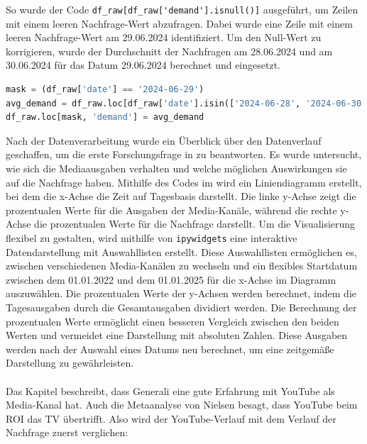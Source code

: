 So wurde der Code \verb|df_raw[df_raw['demand'].isnull()]| ausgeführt, um Zeilen mit einem leeren Nachfrage-Wert abzufragen. Dabei wurde eine Zeile mit einem leeren Nachfrage-Wert am 29.06.2024 identifiziert. Um den Null-Wert zu korrigieren, wurde der Durchschnitt der Nachfragen am 28.06.2024 und am 30.06.2024 für das Datum 29.06.2024 berechnet und eingesetzt.  
\begin{lstlisting}[language=Python, linewidth=\textwidth]
mask = (df_raw['date'] == '2024-06-29')
avg_demand = df_raw.loc[df_raw['date'].isin(['2024-06-28', '2024-06-30']), 'demand'].mean()
df_raw.loc[mask, 'demand'] = avg_demand
\end{lstlisting}
Nach der Datenverarbeitung wurde ein Überblick über den Datenverlauf geschaffen, um die erste Forschungsfrage in 
zu beantworten. Es wurde untersucht, wie sich die Mediaausgaben verhalten und welche möglichen Auswirkungen sie auf die Nachfrage haben. Mithilfe des Codes im  wird ein Liniendiagramm erstellt, bei dem die x-Achse die Zeit auf Tagesbasis darstellt. Die linke y-Achse zeigt die prozentualen Werte für die Ausgaben der Media-Kanäle, während die rechte y-Achse die prozentualen Werte für die Nachfrage darstellt. Um die Visualisierung flexibel zu gestalten, wird mithilfe von \verb|ipywidgets| eine interaktive Datendarstellung mit Auswahllisten erstellt. Diese Auswahllisten ermöglichen es, zwischen verschiedenen Media-Kanälen zu wechseln und ein flexibles Startdatum zwischen dem 01.01.2022 und dem 01.01.2025 für die x-Achse im Diagramm auszuwählen. Die prozentualen Werte der y-Achsen werden berechnet, indem die Tagesausgaben durch die Gesamtausgaben dividiert werden. Die Berechnung der prozentualen Werte ermöglicht einen besseren Vergleich zwischen den beiden Werten und vermeidet eine Darstellung mit absoluten Zahlen. Diese Ausgaben werden nach der Auswahl eines Datums neu berechnet, um eine zeitgemäße Darstellung zu gewährleisten. \\\\
Das Kapitel  beschreibt, dass Generali eine gute Erfahrung mit YouTube als Media-Kanal hat. Auch die Metaanalyse von Nielsen besagt, dass YouTube beim \ac{ROI} das TV übertrifft. Also wird der YouTube-Verlauf mit dem Verlauf der Nachfrage zuerst verglichen:\\\\
